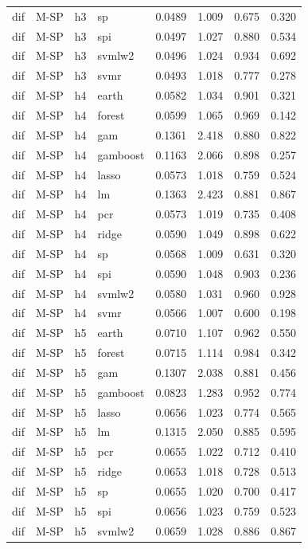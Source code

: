 \begin{ThreePartTable}
\begin{longtable}[t]{llclcccc}
dif & M-SP & h3 & sp & 0.0489 & 1.009 & 0.675 & 0.320\\
dif & M-SP & h3 & spi & 0.0497 & 1.027 & 0.880 & 0.534\\
dif & M-SP & h3 & svmlw2 & 0.0496 & 1.024 & 0.934 & 0.692\\
dif & M-SP & h3 & svmr & 0.0493 & 1.018 & 0.777 & 0.278\\
\addlinespace
dif & M-SP & h4 & earth & 0.0582 & 1.034 & 0.901 & 0.321\\
dif & M-SP & h4 & forest & 0.0599 & 1.065 & 0.969 & 0.142\\
dif & M-SP & h4 & gam & 0.1361 & 2.418 & 0.880 & 0.822\\
dif & M-SP & h4 & gamboost & 0.1163 & 2.066 & 0.898 & 0.257\\
dif & M-SP & h4 & lasso & 0.0573 & 1.018 & 0.759 & 0.524\\
dif & M-SP & h4 & lm & 0.1363 & 2.423 & 0.881 & 0.867\\
dif & M-SP & h4 & pcr & 0.0573 & 1.019 & 0.735 & 0.408\\
dif & M-SP & h4 & ridge & 0.0590 & 1.049 & 0.898 & 0.622\\
dif & M-SP & h4 & sp & 0.0568 & 1.009 & 0.631 & 0.320\\
dif & M-SP & h4 & spi & 0.0590 & 1.048 & 0.903 & 0.236\\
dif & M-SP & h4 & svmlw2 & 0.0580 & 1.031 & 0.960 & 0.928\\
dif & M-SP & h4 & svmr & 0.0566 & 1.007 & 0.600 & 0.198\\
\addlinespace
dif & M-SP & h5 & earth & 0.0710 & 1.107 & 0.962 & 0.550\\
dif & M-SP & h5 & forest & 0.0715 & 1.114 & 0.984 & 0.342\\
dif & M-SP & h5 & gam & 0.1307 & 2.038 & 0.881 & 0.456\\
dif & M-SP & h5 & gamboost & 0.0823 & 1.283 & 0.952 & 0.774\\
dif & M-SP & h5 & lasso & 0.0656 & 1.023 & 0.774 & 0.565\\
dif & M-SP & h5 & lm & 0.1315 & 2.050 & 0.885 & 0.595\\
dif & M-SP & h5 & pcr & 0.0655 & 1.022 & 0.712 & 0.410\\
dif & M-SP & h5 & ridge & 0.0653 & 1.018 & 0.728 & 0.513\\
dif & M-SP & h5 & sp & 0.0655 & 1.020 & 0.700 & 0.417\\
dif & M-SP & h5 & spi & 0.0656 & 1.023 & 0.759 & 0.523\\
dif & M-SP & h5 & svmlw2 & 0.0659 & 1.028 & 0.886 & 0.867\\

\end{longtable}
\end{ThreePartTable}
